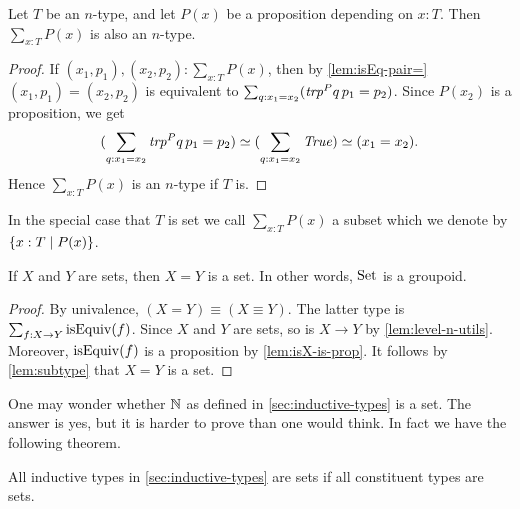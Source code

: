\begin{lemma}\label{lem:subtype}
Let $T$ be an $n$-type, and let $P(x)$ be a proposition depending on $x:T$. 
Then $\sum_{x:T} P(x)$ is also an $n$-type.
\end{lemma}

\begin{proof}
If $(x_1,p_1),(x_2,p_2) : \sum_{x:T} P(x)$, then by \cref{lem:isEq-pair=}
$(x_1,p_1)=(x_2,p_2)$ is equivalent to 
$\sum_{q:x_1=x_2} ({\mathord{\mathit{trp}}}^P q\,p_1 = p_2)$. 
Since $P(x_2)$ is a proposition, we get 
\[
(\sum_{q:x_1=x_2} {\mathord{\mathit{trp}}}^P q\,p_1 = p_2) \simeq 
(\sum_{q:x_1=x_2} \mathop{\mathit{True}}) \simeq (x_1=x_2).
\]
Hence $\sum_{x:T} P(x)$ is an $n$-type if $T$ is.
\end{proof}
In the special case that $T$ is set we call 
$\sum_{x:T} P(x)$ a subset which we denote by 
$\{x:T \mid P(x)\}$.

\begin{lemma}\label{lem:eq_of_sets-is-set}
If $X$ and $Y$ are sets, then $X=Y$ is a set. 
In other words, $\mathord{\mathrm{Set}}$ is a groupoid.
\end{lemma}

\begin{proof}
By univalence, $(X=Y) \equiv (X\equiv Y)$. The latter type is
$\sum_{f:X\to Y} \mathrm{isEquiv}(f)$. Since $X$ and $Y$ are sets,
so is $X\to Y$ by \cref{lem:level-n-utils}. Moreover,
$\mathrm{isEquiv}(f)$ is a proposition by \cref{lem:isX-is-prop}.
It follows by \cref{lem:subtype} that $X=Y$ is a set.  
\end{proof}

One may wonder whether $\mathbb{N}$ as defined in \cref{sec:inductive-types}
is a set. The answer is yes, but it is harder to prove than one
would think. In fact we have the following theorem.

\begin{theorem}\label{thm:isset-inductive-types}
All inductive types in \cref{sec:inductive-types} are sets
if all constituent types are sets.
\end{theorem}

